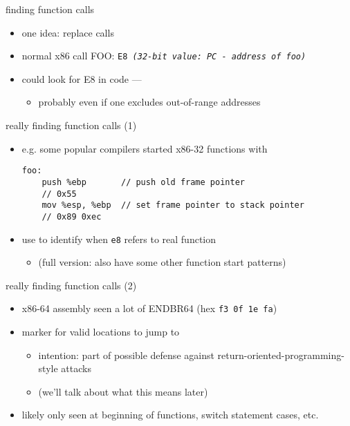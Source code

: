 \begin{frame}[fragile,label=findValidFindFunc]{finding function calls}
    \begin{itemize}
    \item one idea: replace calls
    \item normal x86 call FOO: {\tt E8 \textit{(32-bit value: PC - address of foo)}}
    \item could look for E8 in code --- 
        \begin{itemize}
        \item probably even if one excludes out-of-range addresses
        \end{itemize}
    \end{itemize}
\end{frame}

\begin{frame}[fragile,label=findValidFindFunc2]{really finding function calls (1)}
\lstset{language=myasm,style=small}
    \begin{itemize}
    \item e.g. some popular compilers started x86-32 functions with
\begin{lstlisting}
foo:
    push %ebp       // push old frame pointer
    // 0x55
    mov %esp, %ebp  // set frame pointer to stack pointer
    // 0x89 0xec
\end{lstlisting}
    \item use to identify when {\tt e8} refers to real function
    \begin{itemize}
    \item (full version: also have some other function start patterns)
    \end{itemize}
    \end{itemize}
\end{frame}

\begin{frame}{really finding function calls (2)}
    \begin{itemize}
    \item x86-64 assembly seen a lot of ENDBR64 (hex {\tt f3 0f 1e fa})
    \item marker for valid locations to jump to
        \begin{itemize}
        \item intention: part of possible defense against return-oriented-programming-style attacks
        \item (we'll talk about what this means later)
        \end{itemize}
    \item likely only seen at beginning of functions, switch statement cases, etc.
    \end{itemize}
\end{frame}

